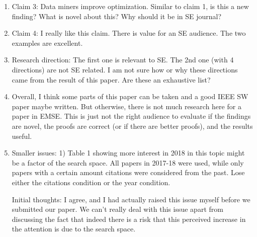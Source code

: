 \documentclass{article}
\newenvironment{com}{\color{blue}\begin{itshape}}{\end{itshape}\vspace{1ex}}
\begin{document}
\begin{enumerate}
\item \begin{com}

Claim 3: Data miners improve optimization. Similar to claim 1, is this a new finding? What is novel about this? Why should it be in SE journal?
\end{com}

\item \begin{com}

Claim 4: I really like this claim. There is value for an SE audience. The two examples are excellent. 
\end{com}

\item \begin{com}

Research direction: The first one is relevant to SE. The 2nd one (with 4 directions) are not SE related. I am not sure how or why these directions came from the result of this paper. Are these an exhaustive list? 
\end{com}

\item \begin{com}

Overall, I think some parts of this paper can be taken and a good IEEE SW paper maybe written. But otherwise, there is not much research here for a paper in EMSE. This is just not the right audience to evaluate if the findings are novel, the proofs are correct (or if there are better proofs), and the results useful. 
\end{com}

\item \begin{com}

Smaller issues:
1) Table 1 showing more interest in 2018 in this topic might be a factor of the search space. All papers in 2017-18 were used, while only papers with a certain amount citations were considered from the past. Lose either the citations condition or the year condition. 
\end{com}

Initial thoughts: I agree, and I had actually raised this issue myself before we submitted our paper. We can't really deal with this issue apart from discussing the fact that indeed there is a risk that this perceived increase in the attention is due to the search space.
\end{enumerate}
\end{document}
